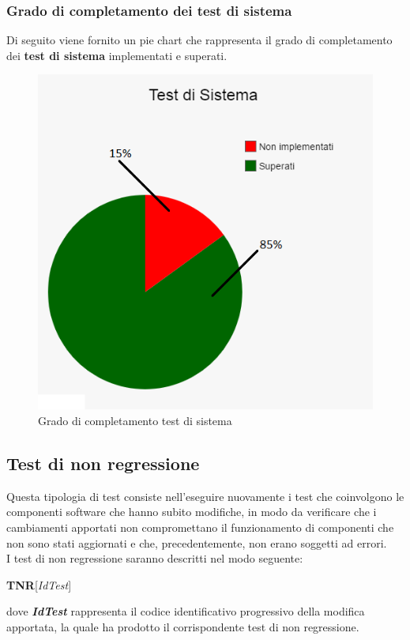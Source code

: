 	\subsubsection{Grado di completamento dei test di sistema}
	Di seguito viene fornito un pie chart che rappresenta il grado di completamento dei \textbf{test di sistema} implementati e superati.
	\begin{figure}[H]
		\centering
		\includegraphics[scale=0.7]{includes/img/test_sistema.png}
		\caption{Grado di completamento test di sistema}
	\end{figure}	
	
	\clearpage
	
	\subsection{Test di non regressione}
	Questa tipologia di test consiste nell'eseguire nuovamente i test che coinvolgono le componenti software che hanno subito modifiche, in modo da verificare che i cambiamenti apportati non compromettano il funzionamento di componenti che non sono stati aggiornati e che, precedentemente, non erano soggetti ad errori.\\
	I test di non regressione saranno descritti nel modo seguente:
	\begin{center}
		\textbf{TNR}[\textit{IdTest}]
	\end{center}
	dove \textbf{\textit{IdTest}} rappresenta il codice identificativo progressivo della modifica apportata, la quale ha prodotto il corrispondente test di non regressione.
	

